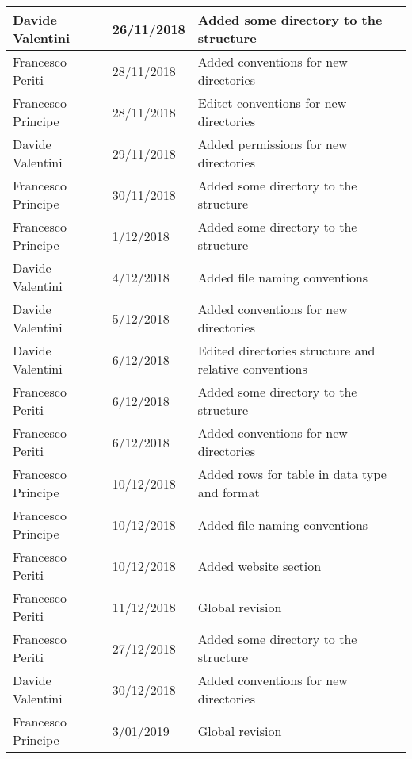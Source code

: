 \begin{table}[H]
\begin{tabularx}{\textwidth}{|l|l|X|}
Davide Valentini & 26/11/2018 & Added some directory to the structure\\ \hline
Francesco Periti & 28/11/2018 & Added conventions for new directories\\ \hline
Francesco Principe & 28/11/2018 & Editet conventions for new directories\\ \hline
Davide Valentini & 29/11/2018 & Added permissions for new directories\\ \hline
Francesco Principe & 30/11/2018 & Added some directory to the structure\\ \hline
Francesco Principe & 1/12/2018 & Added some directory to the structure\\ \hline
Davide Valentini & 4/12/2018 & Added file naming conventions\\ \hline
Davide Valentini & 5/12/2018 & Added conventions for new directories\\ \hline
Davide Valentini & 6/12/2018 & Edited directories structure and relative conventions\\ \hline
Francesco Periti & 6/12/2018 & Added some directory to the structure\\ \hline
Francesco Periti & 6/12/2018 & Added conventions for new directories\\ \hline
Francesco Principe & 10/12/2018 &  Added rows for table in data type and format\\ \hline
Francesco Principe & 10/12/2018 & Added file naming conventions\\ \hline
Francesco Periti & 10/12/2018 & Added website section\\ \hline
Francesco Periti & 11/12/2018 & Global revision\\ \hline
Francesco Periti & 27/12/2018 & Added some directory to the structure\\ \hline
Davide Valentini & 30/12/2018 & Added conventions for new directories\\ \hline
Francesco Principe & 3/01/2019 & Global revision\\ \hline

\end{tabularx}
\end{table}
